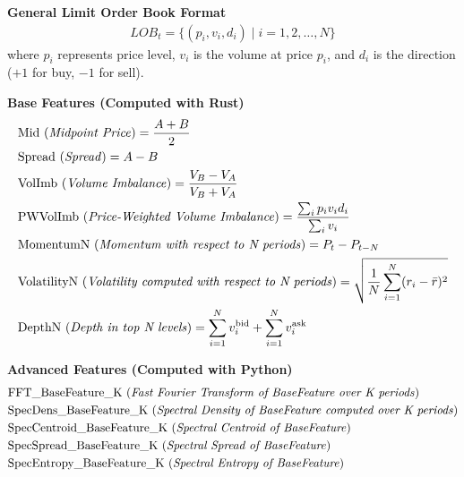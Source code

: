 \documentclass{article}
\begin{document}
\noindent\textbf{General Limit Order Book Format}\vspace{0.5cm}
\begin{align*}
    LOB_t = \{(p_i, v_i, d_i) \mid i = 1, 2, \dots, N\}
\end{align*}
\noindent where $p_i$ represents price level, $v_i$ is the volume at price $p_i$, and $d_i$ is the direction ($+1$ for buy, $-1$ for sell).\vspace{1cm}

\noindent\textbf{Base Features (Computed with Rust)}\vspace{0.3cm}
\begin{align*}
    &\text{Mid (\textit{Midpoint Price})} = \frac{A + B}{2} \\
    &\text{Spread (\textit{Spread})} = A - B \\
    &\text{VolImb (\textit{Volume Imbalance})} = \frac{V_B - V_A}{V_B + V_A} \\
    &\text{PWVolImb (\textit{Price-Weighted Volume Imbalance})} = \frac{\sum_{i} p_i v_i d_i}{\sum_{i} v_i} \\
    &\text{MomentumN (\textit{Momentum with respect to N periods})} = P_t - P_{t-N} \\
    &\text{VolatilityN (\textit{Volatility computed with respect to N periods})} = \sqrt{\frac{1}{N} \sum_{i=1}^{N} (r_i - \bar{r})^2} \\
    &\text{DepthN (\textit{Depth in top N levels})} = \sum_{i=1}^{N} v_{i}^{\text{bid}} + \sum_{i=1}^{N} v_{i}^{\text{ask}}
\end{align*}\vspace{1cm}

\noindent\textbf{Advanced Features (Computed with Python)}\vspace{0.3cm}
\begin{align*}
    &\text{FFT\_BaseFeature\_K (\textit{Fast Fourier Transform of BaseFeature over K periods})} \\
    &\text{SpecDens\_BaseFeature\_K (\textit{Spectral Density of BaseFeature computed over K periods})} \\
    &\text{SpecCentroid\_BaseFeature\_K (\textit{Spectral Centroid of BaseFeature})} \\
    &\text{SpecSpread\_BaseFeature\_K (\textit{Spectral Spread of BaseFeature})} \\
    &\text{SpecEntropy\_BaseFeature\_K (\textit{Spectral Entropy of BaseFeature})}
\end{align*}\vspace{1cm}
\end{document}
